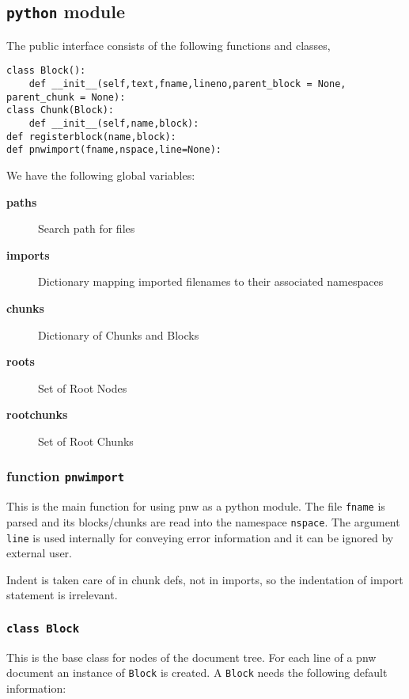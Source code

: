 \documentclass[neutral,proc,reqno]{ml-gen}
\begin{document}
\subsection{\lstinline!python! module}

The public interface consists of the following functions and classes,

\begin{lstlisting}
class Block():
    def __init__(self,text,fname,lineno,parent_block = None, parent_chunk = None):
class Chunk(Block):
    def __init__(self,name,block):
def registerblock(name,block):
def pnwimport(fname,nspace,line=None):
\end{lstlisting}
We have the following global variables:

\begin{description}
\item[\textbf{paths}]
Search path for files

\item[\textbf{imports}]
Dictionary mapping imported filenames to their associated namespaces

\item[\textbf{chunks}]
Dictionary of Chunks and Blocks

\item[\textbf{roots}]
Set of Root Nodes

\item[\textbf{rootchunks}]
Set of Root Chunks

\end{description}
\subsubsection{function \lstinline!pnwimport!}

This is the main function for using pnw as a python module. The file
\lstinline!fname! is parsed and its blocks/chunks are read into the
namespace \lstinline!nspace!. The argument \lstinline!line! is used
internally for conveying error information and it can be ignored by
external user.

Indent is taken care of in chunk defs, not in imports, so the
indentation of import statement is irrelevant.

\subsubsection{\lstinline!class Block!}

This is the base class for nodes of the document tree. For each line of
a pnw document an instance of \lstinline!Block! is created. A
\lstinline!Block! needs the following default information:
\end{document}
